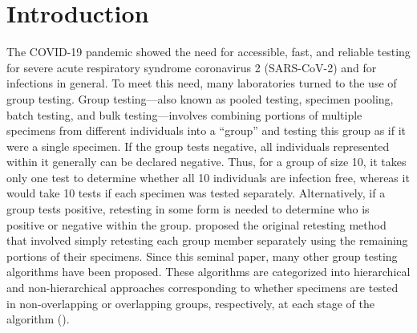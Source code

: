 \section{Introduction}

\noindent The COVID-19 pandemic showed the need for accessible, fast,
and reliable testing for severe acute respiratory syndrome coronavirus
2 (SARS-CoV-2) and for infections in general. To meet this need,
many laboratories turned to the use of group testing. Group testing---also 
known as pooled testing, specimen pooling, batch testing, and
bulk testing---involves combining portions of multiple specimens from
different individuals into a ``group'' and testing this group as
if it were a single specimen. If the group tests negative, all individuals
represented within it generally can be declared negative. Thus, for
a group of size 10, it takes only one test to determine whether all 10 individuals
are infection free, whereas it would take 10 tests if each specimen
was tested separately. Alternatively, if a group tests positive,
retesting in some form is needed to determine who is positive or negative
within the group. \citet{dorfman1943detection} proposed the original
retesting method that involved simply retesting each group member
separately using the remaining portions of their specimens. Since
this seminal paper, many other group testing algorithms have been
proposed. These algorithms are categorized into hierarchical and non-hierarchical
approaches corresponding to whether specimens are tested in non-overlapping
or overlapping groups, respectively, at each stage of the algorithm
(\citealt{hitt2019objective}).

